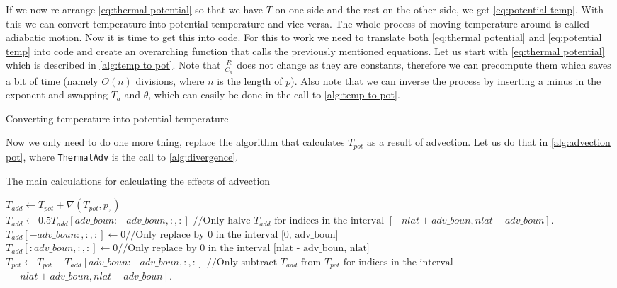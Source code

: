 If we now re-arrange \autoref{eq:thermal potential} so that we have $T$ on one side and the rest on the other side, we get \autoref{eq:potential temp}. With this we can convert temperature into 
potential temperature and vice versa. The whole process of moving temperature around is called adiabatic motion. Now it is time to get this into code. For this to work we need to translate both 
\autoref{eq:thermal potential} and \autoref{eq:potential temp} into code and create an overarching function that calls the previously mentioned equations. Let us start with 
\autoref{eq:thermal potential} which is described in \autoref{alg:temp to pot}. Note that $\frac{R}{C_a}$ does not change as they are constants, therefore we can precompute them which saves 
a bit of time (namely $O(n)$ divisions, where $n$ is the length of $p$). Also note that we can inverse the process by inserting a minus in the exponent and swapping $T_a$ 
and $\theta$, which can easily be done in the call to \autoref{alg:temp to pot}.

\begin{algorithm}
    \caption{Converting temperature into potential temperature}
    \label{alg:temp to pot}
    \Return{$\theta$}
\end{algorithm}

Now we only need to do one more thing, replace the algorithm that calculates $T_{pot}$ as a result of advection. Let us do that in \autoref{alg:advection pot}, where \texttt{ThermalAdv} is the 
call to \autoref{alg:divergence}.

\begin{algorithm}
    \caption{The main calculations for calculating the effects of advection}
    \label{alg:advection pot}
    $T_{add} \leftarrow T_{pot} + \nabla(T_{pot}, p_z)$\;
    $T_{add} \leftarrow 0.5T_{add}[adv\_boun:-adv\_boun, :, :] \text{ //Only halve } T_{add} \text{ for indices in the interval } [-nlat + adv\_boun, nlat - adv\_boun]$. \;
    $T_{add}[-adv\_boun:, :, :] \leftarrow 0 \text{//Only replace by 0 in the interval [0, adv\_boun]}$ \;
    $T_{add}[:adv\_boun, :, :] \leftarrow 0 \text{//Only replace by 0 in the interval [nlat - adv\_boun, nlat]}$ \;
    $T_{pot} \leftarrow T_{pot} - T_{add}[adv\_boun:-adv\_boun, :, :] \text{ //Only subtract } T_{add} \text{ from } T_{pot} \text{ for indices in the interval }$
        $[-nlat + adv\_boun, nlat - adv\_boun]$. \;
\end{algorithm}
